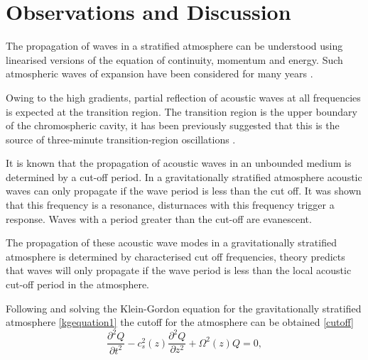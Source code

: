 \documentclass{aa}
\begin{document}

























\section{Observations and Discussion}

The propagation of waves in a stratified atmosphere can be understood using linearised versions of the equation of continuity, momentum and energy. Such atmospheric waves of expansion have been considered for many years \cite{Lamb1932}.

Owing to the high gradients, partial reflection of acoustic waves at all frequencies is expected at the transition region. The transition region is the upper boundary of the chromospheric cavity, it has been previously suggested that this is the source of three-minute transition-region oscillations \cite{Leibacher1971}.

It is known that the propagation of acoustic waves in an unbounded medium is determined by a cut-off period. In a gravitationally stratified atmosphere acoustic waves can only propagate if the wave period is less than the cut off. It was shown that this frequency is a resonance, disturnaces with this frequency trigger a response. Waves with a period greater than the cut-off are evanescent.

The propagation of these acoustic wave modes in a gravitationally stratified atmosphere is determined by characterised cut off frequencies, theory predicts that waves will only propagate if the wave period is less than the local acoustic cut-off period in the atmosphere.

Following \cite{Taroyan2008} and solving the Klein-Gordon equation for the gravitationally stratified atmosphere \eqref{kgequation1} the cutoff for the atmosphere can be obtained \eqref{cutoff}
\begin{equation}\label{kgequation1}
\frac{\partial^2 Q}{\partial t^2} - c_s^2(z) \frac{\partial^2 Q}{\partial z^2} + \Omega^2(z)Q = 0 ,
\end{equation}
\end{document}
